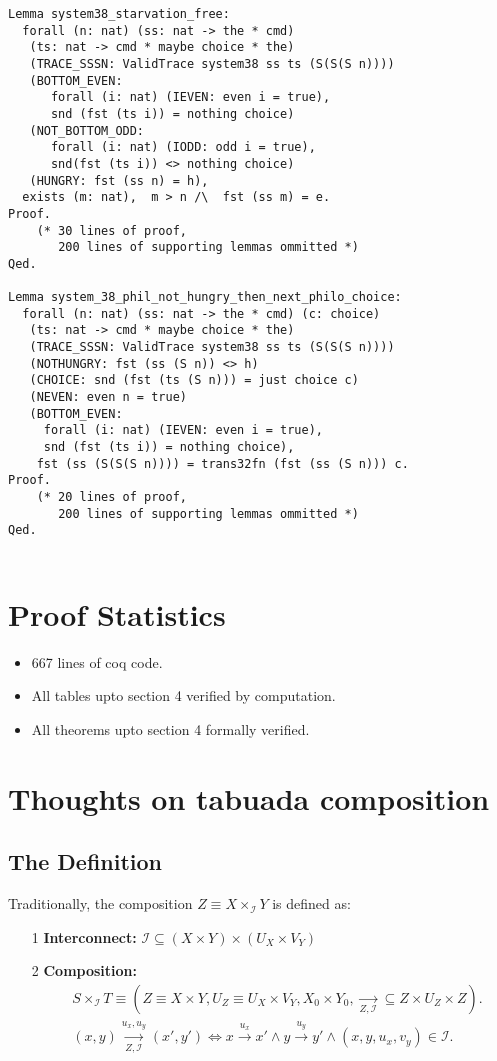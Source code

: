 \documentclass{article}
\begin{document}
\begin{verbatim}
Lemma system38_starvation_free:
  forall (n: nat) (ss: nat -> the * cmd)
   (ts: nat -> cmd * maybe choice * the)
   (TRACE_SSSN: ValidTrace system38 ss ts (S(S(S n))))
   (BOTTOM_EVEN: 
      forall (i: nat) (IEVEN: even i = true), 
      snd (fst (ts i)) = nothing choice)
   (NOT_BOTTOM_ODD: 
      forall (i: nat) (IODD: odd i = true),
      snd(fst (ts i)) <> nothing choice)
   (HUNGRY: fst (ss n) = h),
  exists (m: nat),  m > n /\  fst (ss m) = e.
Proof.
    (* 30 lines of proof, 
       200 lines of supporting lemmas ommitted *)
Qed.

Lemma system_38_phil_not_hungry_then_next_philo_choice:
  forall (n: nat) (ss: nat -> the * cmd) (c: choice) 
   (ts: nat -> cmd * maybe choice * the)
   (TRACE_SSSN: ValidTrace system38 ss ts (S(S(S n))))
   (NOTHUNGRY: fst (ss (S n)) <> h)
   (CHOICE: snd (fst (ts (S n))) = just choice c)
   (NEVEN: even n = true)
   (BOTTOM_EVEN: 
     forall (i: nat) (IEVEN: even i = true), 
     snd (fst (ts i)) = nothing choice),
    fst (ss (S(S(S n)))) = trans32fn (fst (ss (S n))) c.
Proof.
    (* 20 lines of proof, 
       200 lines of supporting lemmas ommitted *)
Qed.
  
\end{verbatim}

\section{Proof Statistics}
\begin{itemize}
        \item  667 lines of coq code.
        \item All tables upto section 4 verified by computation.
        \item All theorems upto section 4 formally verified.
\end{itemize}

\section{Thoughts on tabuada composition}
\subsection{The Definition}
Traditionally, the composition $Z \equiv X \times_{\mathcal I} Y$ is defined as:

\begin{itemize}
    \item[1] \textbf{Interconnect:}
        $\mathcal I \subseteq (X \times Y) \times (U_X \times V_Y)$
    \item[2] \textbf{Composition:}
\begin{align*}
    &S \times_{\mathcal I} T \equiv 
     (Z \equiv X \times Y, U_Z \equiv U_X \times V_Y,  X_0 \times Y_0, \underset{Z, \mathcal{I}}{\rightarrow} \subseteq Z \times U_Z \times Z). \\
    &(x, y) \underset{Z, \mathcal I}{\xrightarrow{u_x,u_y}} (x', y') \iff 
      x \xrightarrow{u_x} x' \land 
      y \xrightarrow{u_y} y' \land (x, y, u_x, v_y) \in \mathcal I.
\end{align*}
\end{itemize}
\end{document}
